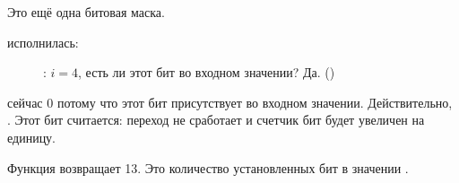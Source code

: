 Это ещё одна битовая маска.

\clearpage
\AND исполнилась:

\begin{figure}[H]
\centering
{}
\caption{\olly: $i=4$, есть ли этот бит во входном значении? Да.  ()}
\label{fig:shifts_olly4_3}
\end{figure}

\ZF сейчас 0 потому что этот бит присутствует во входном значении.
Действительно, . 
Этот бит считается: переход не сработает и счетчик бит будет увеличен на единицу.

Функция возвращает 13. 
Это количество установленных бит в значении .
